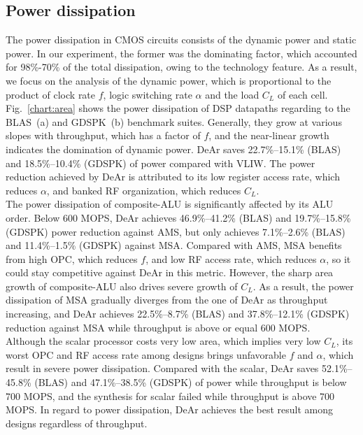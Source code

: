 {    \subsection{Power dissipation}
    The power dissipation in CMOS circuits consists of the dynamic power and static power.
    In our experiment, the former was the dominating factor, which accounted for 98\%-70\% of the total dissipation, 
    owing to the technology feature.
    As a result, we focus on the analysis of the dynamic power, 
    which is proportional to the product of clock rate $f$, logic switching rate $\alpha$ and the load $C_L$ of each cell.
    \\\indent
    Fig.~\ref{chart:area} shows the power dissipation of DSP datapaths regarding to the BLAS~(a) and GDSPK~(b) benchmark suites.
    Generally, they grow at various slopes with throughput, which has a factor of $f$, 
    and the near-linear growth indicates the domination of dynamic power.
    DeAr saves 22.7\%--15.1\% (BLAS) and 18.5\%--10.4\% (GDSPK) of power compared with VLIW.
    The power reduction achieved by DeAr is attributed to its low register access rate, which reduces $\alpha$, 
    and banked RF organization, which reduces $C_L$.
    \\\indent
    The power dissipation of composite-ALU is significantly affected by its ALU order.
    Below 600 MOPS, DeAr achieves 46.9\%--41.2\% (BLAS) and 19.7\%--15.8\% (GDSPK) power reduction against AMS, 
    but only achieves 7.1\%--2.6\% (BLAS) and 11.4\%--1.5\% (GDSPK) against MSA.  
    Compared with AMS, MSA benefits from high OPC, which reduces $f$, and low RF access rate, which reduces $\alpha$, 
    so it could stay competitive against DeAr in this metric.
    However, the sharp area growth of composite-ALU also drives severe growth of $C_L$.
    As a result, the power dissipation of MSA gradually diverges from the one of DeAr as throughput increasing, 
    and DeAr achieves 22.5\%--8.7\% (BLAS) and 37.8\%--12.1\% (GDSPK) reduction against MSA while throughput is above or equal 600 MOPS.
    \\\indent
    Although the scalar processor costs very low area, which implies very low $C_L$, 
    its worst OPC and RF access rate among designs brings unfavorable $f$ and $\alpha$, 
    which result in severe power dissipation. 
    Compared with the scalar, DeAr saves 52.1\%--45.8\% (BLAS) and 47.1\%--38.5\% (GDSPK) of power while throughput is below 700 MOPS, 
    and the synthesis for scalar failed while throughput is above 700 MOPS.
    In regard to power dissipation, DeAr achieves the best result among designs regardless of throughput.
}
